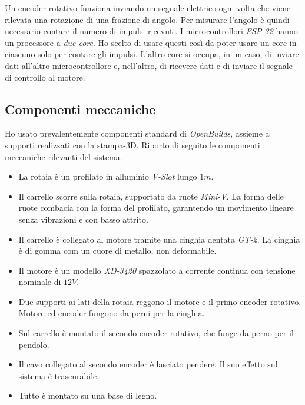 Un encoder rotativo funziona inviando un segnale elettrico ogni volta che
viene rilevata una rotazione di una frazione di angolo.
Per misurare l'angolo è quindi necessario contare il numero di impulsi
ricevuti.
I microcontrollori \emph{ESP-32} hanno un processore a \emph{due core}.
Ho scelto di usare questi così da poter usare un core in ciascuno solo per
contare gli impulsi.
L'altro core si occupa, in un caso, di inviare dati all'altro microcontrollore
e, nell'altro, di ricevere dati e di inviare il segnale di controllo al motore.

\subsection{Componenti meccaniche}
Ho usato prevalentemente componenti standard di \emph{OpenBuilds},
assieme a supporti realizzati con la stampa-3D.
Riporto di seguito le componenti meccaniche rilevanti del sistema.
\begin{itemize}
    \item La rotaia è un profilato in alluminio \emph{V-Slot} lungo $1m$.

    \item Il carrello scorre sulla rotaia, supportato da ruote \emph{Mini-V}.
    La forma delle ruote combacia con la forma del profilato, garantendo
    un movimento lineare senza vibrazioni e con basso attrito.

    \item Il carrello è collegato al motore tramite una cinghia dentata \emph{GT-2}.
    La cinghia è di gomma com un cuore di metallo, non deformabile.

    \item Il motore è un modello \emph{XD-3420} spazzolato a corrente continua
    con tensione nominale di $12V$.

    \item Due supporti ai lati della rotaia reggono il motore e il primo
    encoder rotativo.
    Motore ed encoder fungono da perni per la cinghia.

    \item Sul carrello è montato il secondo encoder rotativo,
    che funge da perno per il pendolo.

    \item Il cavo collegato al secondo encoder è lasciato pendere.
    Il suo effetto sul sistema è trascurabile.

    \item Tutto è montato su una base di legno.

\end{itemize}
